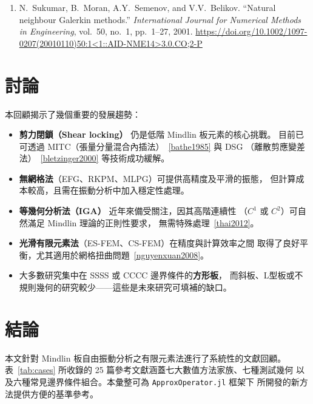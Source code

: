 \documentclass[a4paper,10pt]{article}
\begin{document}
\begin{enumerate}
    \item \label{sukumar2001}
    N.~Sukumar, B.~Moran, A.Y.~Semenov, and V.V.~Belikov.
    ``Natural neighbour Galerkin methods.''
    \emph{International Journal for Numerical Methods in Engineering},
    vol.~50, no.~1, pp.~1--27, 2001.
    \newline \url{https://doi.org/10.1002/1097-0207(20010110)50:1<1::AID-NME14>3.0.CO;2-P}

\end{enumerate}

\section{討論}
\label{sec:discussion}

本回顧揭示了幾個重要的發展趨勢：

\begin{itemize}
    \item \textbf{剪力閉鎖（Shear locking）} 仍是低階 Mindlin 板元素的核心挑戰。
        目前已可透過 MITC（張量分量混合內插法）~\ref{bathe1985} 與 DSG
        （離散剪應變差法）~\ref{bletzinger2000} 等技術成功緩解。
    \item \textbf{無網格法}（EFG、RKPM、MLPG）可提供高精度及平滑的振態，
        但計算成本較高，且需在振動分析中加入穩定性處理。
    \item \textbf{等幾何分析法（IGA）} 近年來備受關注，因其高階連續性
        （$C^{1}$ 或 $C^{2}$）可自然滿足 Mindlin 理論的正則性要求，
        無需特殊處理~\ref{thai2012}。
    \item \textbf{光滑有限元素法}（ES-FEM、CS-FEM）在精度與計算效率之間
        取得了良好平衡，尤其適用於網格扭曲問題~\ref{nguyenxuan2008}。
    \item 大多數研究集中在 SSSS 或 CCCC 邊界條件的\textbf{方形板}，
        而斜板、L型板或不規則幾何的研究較少——這些是未來研究可填補的缺口。
\end{itemize}

\section{結論}
本文針對 Mindlin 板自由振動分析之有限元素法進行了系統性的文獻回顧。
表~\ref{tab:cases} 所收錄的 25 篇參考文獻涵蓋七大數值方法家族、七種測試幾何
以及六種常見邊界條件組合。本彙整可為 \texttt{ApproxOperator.jl} 框架下
所開發的新方法提供方便的基準參考。
\end{document}
